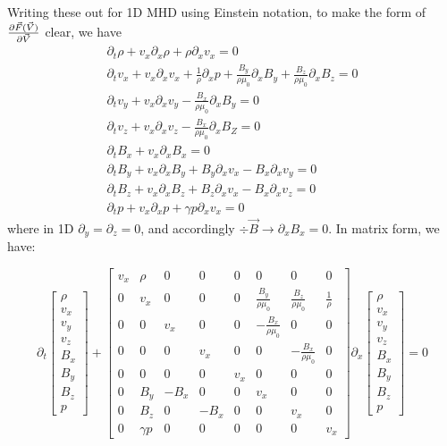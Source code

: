 \documentclass[10pt,letterpaper,notitlepage]{report}
\begin{document}
Writing these out for 1D MHD using Einstein notation, to make the form of $\pdv{\vec F(\vec V)}{\vec V}$ clear, we have
\begin{eqnarray*}
\partial _t \rho + v_x \partial_x \rho + \rho \partial_x v_x = 0 \\
\partial_t v_x + v_x \partial _x v_x + \frac{1}{\rho} \partial_x p + \frac{B_y}{\rho \mu_0} \partial_x B_y + \frac{B_z}{\rho \mu_0} \partial_x B_z = 0 \\
\partial _t v_y + v_x \partial_x v_y - \frac{B_x}{\rho \mu_0} \partial_x B_y = 0 \\
\partial_t v_z + v_x \partial_x v_z - \frac{B_x}{\rho \mu_0} \partial_x B_Z = 0 \\
\partial_t B_x + v_x \partial_x B_x = 0 \\
\partial_t B_y + v_x \partial_x B_y + B_y \partial_x v_x - B_x \partial_x v_y = 0 \\
\partial_t B_z + v_x \partial_x B_z + B_z \partial_x v_x - B_x \partial_x v_z = 0 \\
\partial_t p + v_x \partial_x p + \gamma p \partial_x v_x = 0
\end{eqnarray*}
where in 1D $\partial_y = \partial_z = 0$, and accordingly $\div \vec B \rightarrow \partial_x B_x = 0$. In matrix form, we have:

\begin{equation}
\partial_t \begin{bmatrix}
\rho \\ v_x \\ v_y \\ v_z \\ B_x \\ B_y \\ B_z \\ p
\end{bmatrix} + \begin{bmatrix}
v_x & \rho & 0 & 0 & 0 & 0 & 0 & 0\\
0 & v_x & 0 & 0 & 0 & \frac{B_y}{\rho \mu_0} & \frac{B_z}{\rho \mu_0} & \frac{1}{\rho} \\
0 & 0 & v_x & 0 & 0 & - \frac{B_x}{\rho \mu_0} & 0 & 0 \\
0 & 0 & 0 & v_x & 0 & 0 & - \frac{B_x}{\rho \mu_0} & 0 \\
0 & 0 & 0 & 0 & v_x & 0 & 0 & 0 \\
0 & B_y & - B_x & 0 & 0 & v_x & 0 & 0 \\
0 & B_z & 0 & - B_x & 0 & 0 & v_x & 0 \\
0 & \gamma p & 0 & 0 & 0 & 0 & 0 & v_x
\end{bmatrix} \partial_x \begin{bmatrix} 
\rho \\ v_x \\ v_y \\ v_z \\ B_x \\ B_y \\ B_z \\ p
\end{bmatrix} = 0
\end{equation}
\end{document}
